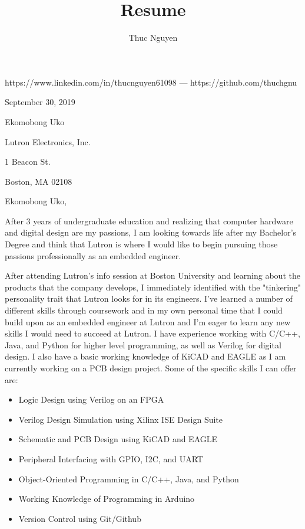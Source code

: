 \documentclass{article}
\renewcommand{\maketitle}
{\begin{center}
{\huge\bfseries\theauthor}
\vspace{.5em}

https://www.linkedin.com/in/thucnguyen61098 --- https://github.com/thuchgnu

\end{center}}
\begin{document}
\title{Resume}
\author{Thuc Nguyen}
\maketitle
\vspace{-.5em}

\begin{flushleft}
\vspace{1.6em}

September 30, 2019

\vspace{1.6em}
Ekomobong Uko

Lutron Electronics, Inc.

1 Beacon St.

Boston, MA 02108

\end{flushleft}
\vspace{1.6em}
Ekomobong Uko,

\vspace{1em}
After 3 years of undergraduate education and realizing that computer hardware and digital design are my passions, I am looking towards life after my Bachelor's Degree and think that Lutron is where I would like to begin pursuing those passions professionally as an embedded engineer.

\vspace{.6em}
After attending Lutron's info session at Boston University and learning about the products that the company develops, I immediately identified with the "tinkering" personality trait that Lutron looks for in its engineers. I've learned a number of different skills through coursework and in my own personal time that I could build upon as an embedded engineer at Lutron and I'm eager to learn any new skills I would need to succeed at Lutron. I have experience working with C/C++, Java, and Python for higher level programming, as well as Verilog for digital design. I also have a basic working knowledge of KiCAD and EAGLE as I am currently working on a PCB design project. Some of the specific skills I can offer are:

\begin{itemize}
  \item{Logic Design using Verilog on an FPGA}
  \item{Verilog Design Simulation using Xilinx ISE Design Suite}
  \item{Schematic and PCB Design using KiCAD and EAGLE}
  \item{Peripheral Interfacing with GPIO, I2C, and UART}
  \item{Object-Oriented Programming in C/C++, Java, and Python}
  \item{Working Knowledge of Programming in Arduino}
  \item{Version Control using Git/Github}
\end{itemize}
\end{document}
